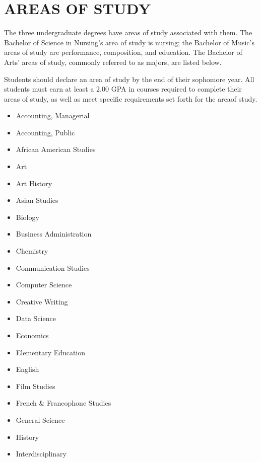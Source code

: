 \documentclass[
  letterpaper,
]{scrbook}
\providecommand{\tightlist}{%
  \setlength{\itemsep}{0pt}\setlength{\parskip}{0pt}}
\begin{document}
\hypertarget{areas-of-study}{%
\chapter{AREAS OF STUDY}\label{areas-of-study}}

The three undergraduate degrees have areas of study associated with
them. The Bachelor of Science in Nursing's area of study is nursing; the
Bachelor of Music's areas of study are performance, composition, and
education. The Bachelor of Arts' areas of study, commonly referred to as
majors, are listed below.

Students should declare an area of study by the end of their sophomore
year. All students must earn at least a 2.00 GPA in courses required to
complete their areas of study, as well as meet specific requirements set
forth for the areaof study.

\begin{itemize}
\tightlist
\item
  Accounting, Managerial
\item
  Accounting, Public
\item
  African American Studies
\item
  Art
\item
  Art History
\item
  Asian Studies
\item
  Biology
\item
  Business Administration
\item
  Chemistry
\item
  Communication Studies
\item
  Computer Science
\item
  Creative Writing
\item
  Data Science
\item
  Economics
\item
  Elementary Education
\item
  English
\item
  Film Studies
\item
  French \& Francophone Studies
\item
  General Science
\item
  History
\item
  Interdisciplinary
\end{itemize}
\end{document}
